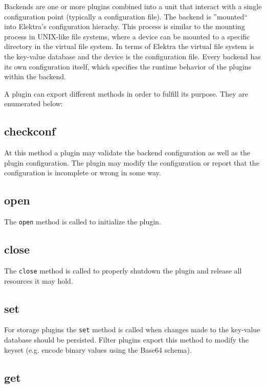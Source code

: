 Backends are one or more plugins combined into a unit that interact with a single configuration point (typically a configuration file).
The backend is ''mounted`` into Elektra's configuration hierachy.
This process is similar to the mounting process in UNIX-like file systems, where a device can be mounted to a specific directory in the virtual file system.
In terms of Elektra the virtual file system is the key-value database and the device is the configuration file.
Every backend has its own configuration itself, which specifies the runtime behavior of the plugins within the backend.

A plugin can export different methods in order to fulfill its purpose.
They are enumerated below:

\subsection{checkconf}\label{checkconf}

At this method a plugin may validate the backend configuration as well as
the plugin configuration. The plugin may modify the configuration or
report that the configuration is incomplete or wrong in some way.

\subsection{open}\label{open}

The \texttt{open} method is called to initialize the plugin.

\subsection{close}\label{close}

The \texttt{close} method is called to properly shutdown the plugin and
release all resources it may hold.

\subsection{set}\label{set}

For storage plugins the \texttt{set} method is called when changes made to the key-value
database should be persisted.
Filter plugins export this method to modify the keyset (e.g. encode binary values using the Base64 schema).

\subsection{get}\label{get}

